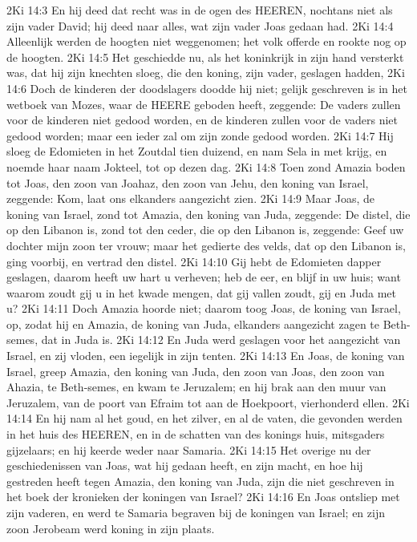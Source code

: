 2Ki 14:3  En hij deed dat recht was in de ogen des HEEREN, nochtans niet als zijn vader David; hij deed naar alles, wat zijn vader Joas gedaan had.
2Ki 14:4  Alleenlijk werden de hoogten niet weggenomen; het volk offerde en rookte nog op de hoogten.
2Ki 14:5  Het geschiedde nu, als het koninkrijk in zijn hand versterkt was, dat hij zijn knechten sloeg, die den koning, zijn vader, geslagen hadden,
2Ki 14:6  Doch de kinderen der doodslagers doodde hij niet; gelijk geschreven is in het wetboek van Mozes, waar de HEERE geboden heeft, zeggende: De vaders zullen voor de kinderen niet gedood worden, en de kinderen zullen voor de vaders niet gedood worden; maar een ieder zal om zijn zonde gedood worden.
2Ki 14:7  Hij sloeg de Edomieten in het Zoutdal tien duizend, en nam Sela in met krijg, en noemde haar naam Jokteel, tot op dezen dag.
2Ki 14:8  Toen zond Amazia boden tot Joas, den zoon van Joahaz, den zoon van Jehu, den koning van Israel, zeggende: Kom, laat ons elkanders aangezicht zien.
2Ki 14:9  Maar Joas, de koning van Israel, zond tot Amazia, den koning van Juda, zeggende: De distel, die op den Libanon is, zond tot den ceder, die op den Libanon is, zeggende: Geef uw dochter mijn zoon ter vrouw; maar het gedierte des velds, dat op den Libanon is, ging voorbij, en vertrad den distel.
2Ki 14:10  Gij hebt de Edomieten dapper geslagen, daarom heeft uw hart u verheven; heb de eer, en blijf in uw huis; want waarom zoudt gij u in het kwade mengen, dat gij vallen zoudt, gij en Juda met u?
2Ki 14:11  Doch Amazia hoorde niet; daarom toog Joas, de koning van Israel, op, zodat hij en Amazia, de koning van Juda, elkanders aangezicht zagen te Beth-semes, dat in Juda is.
2Ki 14:12  En Juda werd geslagen voor het aangezicht van Israel, en zij vloden, een iegelijk in zijn tenten.
2Ki 14:13  En Joas, de koning van Israel, greep Amazia, den koning van Juda, den zoon van Joas, den zoon van Ahazia, te Beth-semes, en kwam te Jeruzalem; en hij brak aan den muur van Jeruzalem, van de poort van Efraim tot aan de Hoekpoort, vierhonderd ellen.
2Ki 14:14  En hij nam al het goud, en het zilver, en al de vaten, die gevonden werden in het huis des HEEREN, en in de schatten van des konings huis, mitsgaders gijzelaars; en hij keerde weder naar Samaria.
2Ki 14:15  Het overige nu der geschiedenissen van Joas, wat hij gedaan heeft, en zijn macht, en hoe hij gestreden heeft tegen Amazia, den koning van Juda, zijn die niet geschreven in het boek der kronieken der koningen van Israel?
2Ki 14:16  En Joas ontsliep met zijn vaderen, en werd te Samaria begraven bij de koningen van Israel; en zijn zoon Jerobeam werd koning in zijn plaats.
